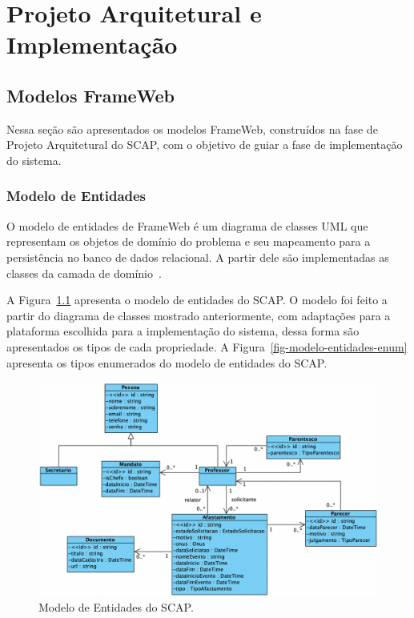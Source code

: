 \chapter{Projeto Arquitetural e Implementação}
\label{chap-projeto}


\section{Modelos FrameWeb}
\label{sec-projeto-frameweb}

Nessa seção são apresentados os modelos FrameWeb, construídos na fase de Projeto Arquitetural
do SCAP, com o objetivo de guiar a fase de implementação do sistema.

\subsection{Modelo de Entidades}
\label{subsec-frameweb-entidades}
O modelo de entidades de FrameWeb é um diagrama de classes UML que representam
os objetos de domínio do problema e seu mapeamento para a persistência no banco de dados
relacional. A partir dele são implementadas as classes da camada de domínio~\cite{souza:2007}.

A Figura~\ref{fig-modelo-entidades} apresenta o modelo de entidades do SCAP. O modelo foi feito
a partir do diagrama de classes mostrado anteriormente, com adaptações para a plataforma 
escolhida para a implementação do sistema, dessa forma são apresentados os tipos
de cada propriedade. A Figura~\ref{fig-modelo-entidades-enum} apresenta
os tipos enumerados do modelo de entidades do SCAP.

\begin{figure}
    \centering
    \includegraphics[width=1\textwidth]{figuras/fig-modelo-entidades.png}
    \caption{Modelo de Entidades do SCAP.}
    \label{fig-modelo-entidades}
\end{figure}

